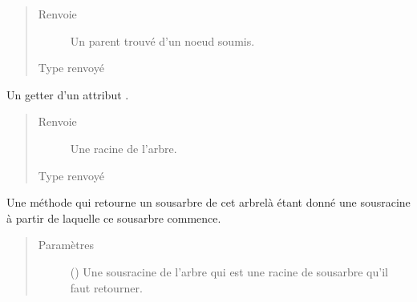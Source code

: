 \documentclass[letterpaper,10pt,french]{sphinxmanual}
\begin{document}
\begin{fulllineitems}
\begin{fulllineitems}
\begin{quote}
\begin{description}
\item[{Renvoie}] \leavevmode
{} \textendash{} Un parent trouvé d’un noeud soumis.

\item[{Type renvoyé}] \leavevmode
{\hyperref[\detokenize{index:StrategyTree.NodeST}]{}}

\end{description}\end{quote}

\end{fulllineitems}


\begin{fulllineitems}
\label{\detokenize{index:StrategyTree.StrategyTree.get_root}}
Un getter d’un attribut .
\begin{quote}\begin{description}
\item[{Renvoie}] \leavevmode
{} \textendash{} Une racine de l’arbre.

\item[{Type renvoyé}] \leavevmode
{\hyperref[\detokenize{index:StrategyTree.NodeST}]{}}

\end{description}\end{quote}

\end{fulllineitems}


\begin{fulllineitems}
\label{\detokenize{index:StrategyTree.StrategyTree.get_sub_tree}}
Une méthode qui retourne un sous\sphinxhyphen{}arbre de cet arbre\sphinxhyphen{}là étant donné une sous\sphinxhyphen{}racine à partir de laquelle ce
sous\sphinxhyphen{}arbre commence.
\begin{quote}\begin{description}
\item[{Paramètres}] \leavevmode
{} ({\hyperref[\detokenize{index:StrategyTree.NodeST}]{}}) \textendash{} Une sous\sphinxhyphen{}racine de l’arbre qui est une racine de sous\sphinxhyphen{}arbre qu’il faut retourner.


\end{description}
\end{quote}
\end{fulllineitems}
\end{fulllineitems}
\end{document}
